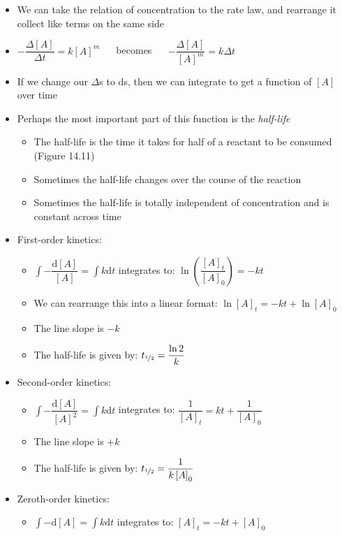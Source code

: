 \documentclass[12pt, openany, letterpaper]{memoir}
\begin{document}
\begin{itemize}
	\item We can take the relation of concentration to the rate law, and rearrange it collect like terms on the same side
	\item $-\dfrac{\Delta \left[A\right]}{\Delta t} = k\left[A\right]^m$ ~~ becomes ~~ $-\dfrac{\Delta \left[A\right]}{\left[A\right]^m} = k\Delta t$
	\item If we change our $\Delta$s to $\mathrm{d}$s, then we can integrate to get a function of $\left[A\right]$ over time
	\item Perhaps the most important part of this function is the \emph{half-life}
	\begin{itemize}
		\item The half-life is the time it takes for half of a reactant to be consumed (Figure 14.11)
		\item Sometimes the half-life changes over the course of the reaction
		\item Sometimes the half-life is totally independent of concentration and is constant across time
	\end{itemize}
	\item First-order kinetics:
	\begin{itemize}
		\item $\int-\dfrac{\mathrm{d} \left[A\right]}{\left[A\right]} = \int k\mathrm{d} t$ integrates to: $\ln\left(\dfrac{[A]_t}{[A]_0}\right) = -kt$
		\item We can rearrange this into a linear format: $\ln \left[A\right]_t = -kt + \ln\left[A\right]_0$
		\item The line slope is $-k$
		\item The half-life is given by: $t_{\nicefrac{1}{2}}=\dfrac{\ln 2}{k}$ 
	\end{itemize}
	\item Second-order kinetics:
	\begin{itemize}
		\item $\int-\dfrac{\mathrm{d} \left[A\right]}{\left[A\right]^2} = \int k\mathrm{d} t$ integrates to: $\dfrac{1}{[A]_t} = kt + \dfrac{1}{[A]_0}$
		\item The line slope is $+k$
		\item The half-life is given by: $t_{\nicefrac{1}{2}}=\dfrac{1}{k\left[A\right]_0}$ 
	\end{itemize}
	\item Zeroth-order kinetics:
	\begin{itemize}
		\item $\int-\mathrm{d} \left[A\right] = \int k\mathrm{d} t$ integrates to: $[A]_t = -kt + [A]_0$

\end{itemize}
\end{itemize}
\end{document}
